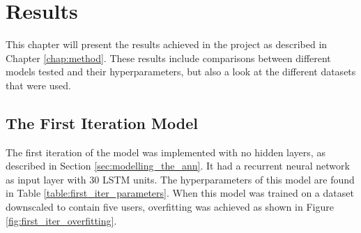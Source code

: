 \chapter{Results}\label{chap:results}
This chapter will present the results achieved in the project as described in Chapter \ref{chap:method}. These results include comparisons between different models tested and their hyperparameters, but also a look at the different datasets that were used.

\section{The First Iteration Model}
The first iteration of the model was implemented with no hidden layers, as described in Section \ref{sec:modelling_the_ann}. It had a recurrent neural network as input layer with $30$ LSTM units. The hyperparameters of this model are found in Table \ref{table:first_iter_parameters}. When this model was trained on a dataset downscaled to contain five users, overfitting was achieved as shown in Figure \ref{fig:first_iter_overfitting}.
